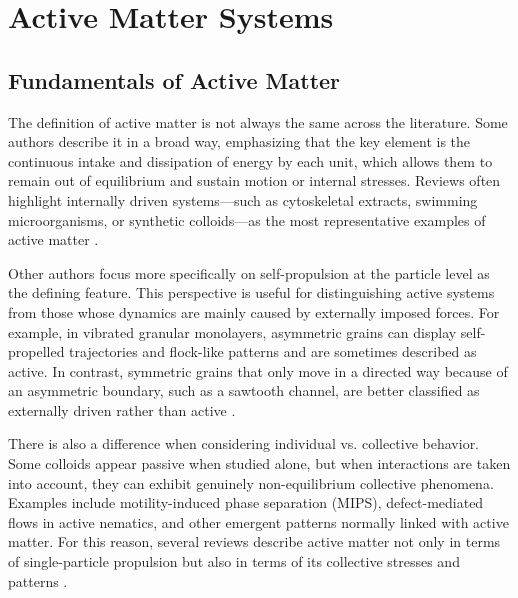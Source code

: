 \chapter{Active Matter Systems}
\label{ch:activeandpassivemattersystems}

\section{Fundamentals of Active Matter}
\label{sct:fundamentalsofactivematter}


The definition of active matter is not always the same across the literature. Some authors describe it in a broad way, emphasizing that the key element is the continuous intake and dissipation of energy by each unit, which allows them to remain out of equilibrium and sustain motion or internal stresses. Reviews often highlight internally driven systems—such as cytoskeletal extracts, swimming microorganisms, or synthetic colloids—as the most representative examples of active matter \cite{ramaswamy2010mechanics, marchetti2013hydrodynamics, bechinger2016active}.

Other authors focus more specifically on self-propulsion at the particle level as the defining feature. This perspective is useful for distinguishing active systems from those whose dynamics are mainly caused by externally imposed forces. For example, in vibrated granular monolayers, asymmetric grains can display self-propelled trajectories and flock-like patterns and are sometimes described as active. In contrast, symmetric grains that only move in a directed way because of an asymmetric boundary, such as a sawtooth channel, are better classified as externally driven rather than active \cite{deseigne2010collective, mobarakabadi2013granular, fernandez2022active}.

There is also a difference when considering individual vs. collective behavior. Some colloids appear passive when studied alone, but when interactions are taken into account, they can exhibit genuinely non-equilibrium collective phenomena. Examples include motility-induced phase separation (MIPS), defect-mediated flows in active nematics, and other emergent patterns normally linked with active matter. For this reason, several reviews describe active matter not only in terms of single-particle propulsion but also in terms of its collective stresses and patterns \cite{cates2015motility, doostmohammadi2018active}.

